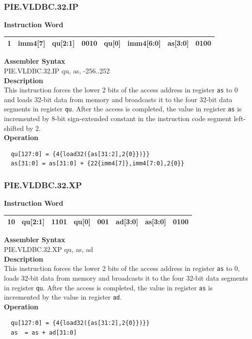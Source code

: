 \newpage
\subsubsection{PIE.VLDBC.32.IP}\label{instruction:PIEVLDBC32IP}
\setlength\tabcolsep{6pt}
\textbf{Instruction Word} \\
\begin{tabular}{|c|c|c|c|c|c|c|c|}
	\hline
	1 & imm4[7] & qu[2:1] & 0010 & qu[0] & imm4[6:0] & as[3:0] & 0100 \\
	\hline
\end{tabular}

\textbf{Assembler Syntax} \\
PIE.VLDBC.32.IP qu, as, -256..252 \\
\textbf{Description} \\
This instruction forces the lower 2 bits of the access address in register \lstinline{as} to 0 and loads 32-bit data from memory and broadcasts it to the four 32-bit data segments in register \lstinline{qu}. After the access is completed, the value in register \lstinline{as} is incremented by 8-bit sign-extended constant in the instruction code segment left-shifted by 2.\\
\textbf{Operation}
\begin{lstlisting}
  qu[127:0] = {4{load32({as[31:2],2{0}})}}
  as[31:0] = as[31:0] + {22{imm4[7]},imm4[7:0],2{0}}
\end{lstlisting}

\newpage
\subsubsection{PIE.VLDBC.32.XP}\label{instruction:PIEVLDBC32XP}
\setlength\tabcolsep{6pt}
\textbf{Instruction Word} \\
\begin{tabular}{|c|c|c|c|c|c|c|c|}
	\hline
	10 & qu[2:1] & 1101 & qu[0] & 001 & ad[3:0] & as[3:0] & 0100 \\
	\hline
\end{tabular}

\textbf{Assembler Syntax} \\
PIE.VLDBC.32.XP qu, as, ad \\
\textbf{Description} \\
This instruction forces the lower 2 bits of the access address in register \lstinline{as} to 0, loads 32-bit data from memory and broadcasts it to the four 32-bit data segments in register \lstinline{qu}. After the access is completed, the value in register \lstinline{as} is incremented by the value in register \lstinline{ad}.\\
\textbf{Operation}
\begin{lstlisting}
  qu[127:0] = {4{load32({as[31:2],2{0}})}}
  as  = as + ad[31:0]
\end{lstlisting}

